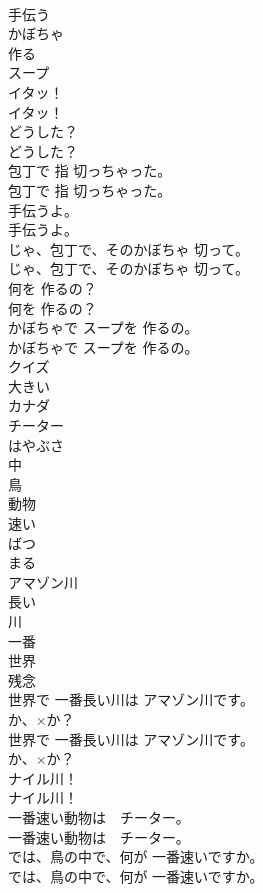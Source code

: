 \documentclass[8pt]{extreport}
\begin{document}
\begin{CJK}{UTF8}{min}
\\	手伝う
\\	かぼちゃ
\\	作る
\\	スープ
\\	イタッ！	
\\	イタッ！ 
\\	どうした？	
\\	どうした？ 
\\	包丁で 指 切っちゃった。	
\\	包丁で 指 切っちゃった。 
\\	手伝うよ。	
\\	手伝うよ。 
\\	じゃ、包丁で、そのかぼちゃ 切って。	
\\	じゃ、包丁で、そのかぼちゃ 切って。 
\\	何を 作るの？	
\\	何を 作るの？ 
\\	かぼちゃで スープを 作るの。	
\\	かぼちゃで スープを 作るの。 
\\	クイズ
\\	大きい
\\	カナダ
\\	チーター
\\	はやぶさ
\\	中
\\	鳥
\\	動物
\\	速い
\\	ばつ
\\	まる
\\	アマゾン川
\\	長い
\\	川
\\	一番
\\	世界
\\	残念
\\	世界で 一番長い川は アマゾン川です。
\\	か、×か？	
\\	世界で 一番長い川は アマゾン川です。
\\	か、×か？ 
\\	ナイル川！	
\\	ナイル川！ 
\\	一番速い動物は　チーター。	
\\	一番速い動物は　チーター。 
\\	では、鳥の中で、何が 一番速いですか。	
\\	では、鳥の中で、何が 一番速いですか。 

\end{CJK}
\end{document}
